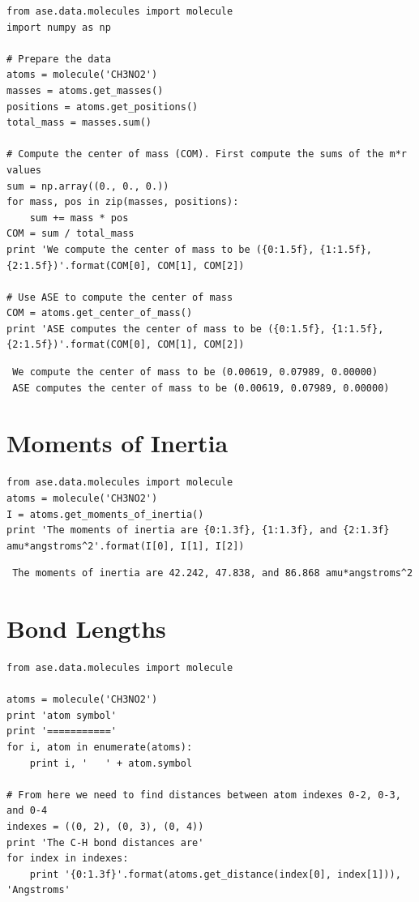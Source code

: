 \documentclass[11pt]{article}
\begin{document}
\begin{verbatim}
from ase.data.molecules import molecule
import numpy as np

# Prepare the data
atoms = molecule('CH3NO2')
masses = atoms.get_masses()
positions = atoms.get_positions()
total_mass = masses.sum()

# Compute the center of mass (COM). First compute the sums of the m*r values
sum = np.array((0., 0., 0.))
for mass, pos in zip(masses, positions):
    sum += mass * pos
COM = sum / total_mass
print 'We compute the center of mass to be ({0:1.5f}, {1:1.5f}, {2:1.5f})'.format(COM[0], COM[1], COM[2])

# Use ASE to compute the center of mass
COM = atoms.get_center_of_mass()
print 'ASE computes the center of mass to be ({0:1.5f}, {1:1.5f}, {2:1.5f})'.format(COM[0], COM[1], COM[2])
\end{verbatim}

\begin{verbatim}
 We compute the center of mass to be (0.00619, 0.07989, 0.00000)
 ASE computes the center of mass to be (0.00619, 0.07989, 0.00000)
\end{verbatim}
\section{Moments of Inertia}
\label{sec-3}


\begin{verbatim}
from ase.data.molecules import molecule
atoms = molecule('CH3NO2')
I = atoms.get_moments_of_inertia()
print 'The moments of inertia are {0:1.3f}, {1:1.3f}, and {2:1.3f} amu*angstroms^2'.format(I[0], I[1], I[2])
\end{verbatim}

\begin{verbatim}
 The moments of inertia are 42.242, 47.838, and 86.868 amu*angstroms^2
\end{verbatim}
\section{Bond Lengths}
\label{sec-4}


\begin{verbatim}
from ase.data.molecules import molecule

atoms = molecule('CH3NO2')
print 'atom symbol'
print '==========='
for i, atom in enumerate(atoms):
    print i, '   ' + atom.symbol

# From here we need to find distances between atom indexes 0-2, 0-3, and 0-4
indexes = ((0, 2), (0, 3), (0, 4))
print 'The C-H bond distances are'
for index in indexes:
    print '{0:1.3f}'.format(atoms.get_distance(index[0], index[1])), 'Angstroms'
\end{verbatim}
\end{document}
